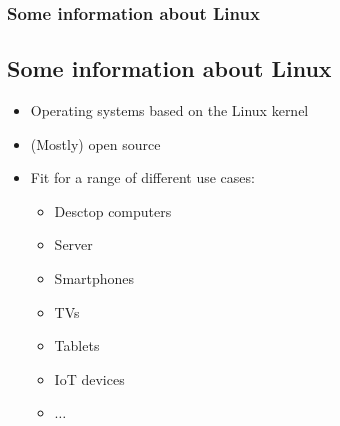 \begin{frame}
	\frametitle{Some information about Linux}
	\subsection{Some information about Linux}
	
	\begin{itemize}
		\item Operating systems based on the Linux kernel
		\item (Mostly) open source
		\item Fit for a range of different use cases:
			\begin{tiny}
				\begin{itemize}
					\item Desctop computers
					\item Server
					\item Smartphones
					\item TVs
					\item Tablets
					\item IoT devices
					\item $\dots$
				\end{itemize}
			\end{tiny}
	\end{itemize}
\end{frame}
